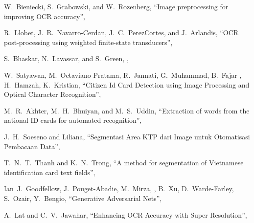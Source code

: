 \documentclass[uplatex, twocolumn,10pt]{jsarticle}
\begin{document}
\begin{thebibliography}{99}
    W.~Bieniecki, S.~Grabowski, and W.~Rozenberg,
    \newblock “Image preprocessing for improving OCR accuracy”,
    
    R.~Llobet, J.~R.~Navarro-Cerdan, J.~C.~PerezCortes, and J.~Arlandis,
    \newblock “OCR post-processing using weighted finite-state transducers”,
    
    S.~Bhaskar, N.~Lavassar, and S.~Green,
    ,
    
    W.~Satyawan, M.~Octaviano Pratama, R.~Jannati, G.~Muhammad, B.~Fajar , H.~Hamzah, K.~Kristian,
    \newblock “Citizen Id Card Detection using Image Processing and Optical Character Recognition”,
    
    M.~R.~Akhter, M.~H.~Bhuiyan, and M.~S.~Uddin,
    \newblock “Extraction of words from the national ID cards for automated recognition”,
    
    J.~H.~Soeseno and Liliana,
    \newblock “Segmentasi Area KTP dari Image untuk Otomatisasi Pembacaan Data”,
    
    T.~N.~T.~Thanh and K.~N.~Trong,
    \newblock “A method for segmentation of Vietnamese identification card text fields”,
    
    Ian~J.~Goodfellow, J.~Pouget-Abadie, M.~Mirza, , B.~Xu, D.~Warde-Farley, S.~Ozair, Y.~Bengio,
    \newblock “Generative Adversarial Nets”,
    
    A.~Lat and C.~V.~Jawahar,
    \newblock “Enhancing OCR Accuracy with Super Resolution”,
    

\end{thebibliography}
\end{document}
